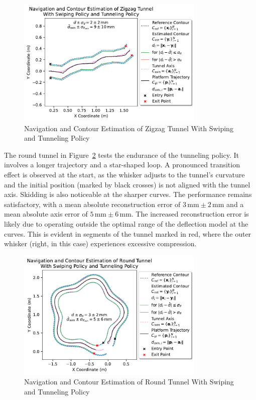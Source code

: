 \begin{figure}[!htb]
    \centering
    \includegraphics[width=0.8\textwidth]{figures/experiments/zigzag-tunnel-swiping-tunneling}
    \caption{Navigation and Contour Estimation of Zigzag Tunnel With Swiping and Tunneling Policy}
    \label{fig:experiment-zigzag-tunnel-swiping-tunneling}
\end{figure}

The round tunnel in Figure~\ref{fig:experiment-round-tunnel-swiping-tunneling} tests the endurance of the tunneling policy.
It involves a longer trajectory and a star-shaped loop.
A pronounced transition effect is observed at the start, as the whisker adjusts to the tunnel's curvature and the initial position (marked by black crosses) is not aligned with the tunnel axis.
Skidding is also noticeable at the sharper curves.
The performance remains satisfactory, with a mean absolute reconstruction error of $3\,\text{mm} \pm 2\,\text{mm}$ and a mean absolute axis error of $5\,\text{mm} \pm 6\,\text{mm}$.
The increased reconstruction error is likely due to operating outside the optimal range of the deflection model at the curves.
This is evident in segments of the tunnel marked in red, where the outer whisker (right, in this case) experiences excessive compression.

\begin{figure}[!htb]
    \centering
    \includegraphics[width=0.8\textwidth]{figures/experiments/round-tunnel-swiping-tunneling}
    \caption{Navigation and Contour Estimation of Round Tunnel With Swiping and Tunneling Policy}
    \label{fig:experiment-round-tunnel-swiping-tunneling}
\end{figure}
